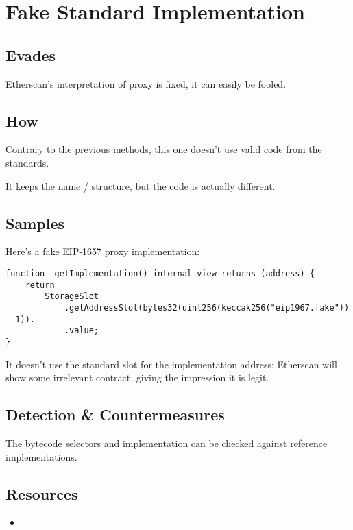 \section{Fake Standard Implementation}

\subsection{Evades}

Etherscan's interpretation of proxy is fixed, it can easily be fooled.

\subsection{How}

Contrary to the previous methods, this one doesn't use valid code from the standards.

It keeps the name / structure, but the code is actually different.

\subsection{Samples}

Here's a fake EIP-1657 proxy implementation:

\begin{highlight}
\begin{lstlisting}[language=Solidity]
function _getImplementation() internal view returns (address) {
    return
        StorageSlot
            .getAddressSlot(bytes32(uint256(keccak256("eip1967.fake")) - 1)).
            .value;
}
\end{lstlisting}
\end{highlight}

It doesn't use the standard slot for the implementation address:
Etherscan will show some irrelevant contract, giving the impression it is legit.

\subsection{Detection \& Countermeasures}

The bytecode selectors and implementation can be checked against reference implementations.

\subsection{Resources}

\begin{itemize}
\item{\cite{video-masquerading-code}}
\end{itemize}
